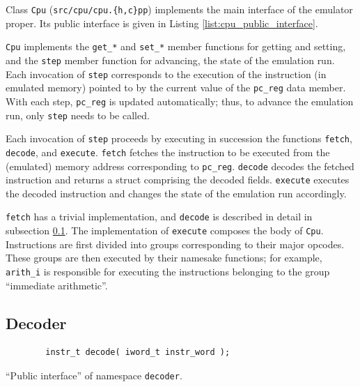 \documentclass[a4paper]{amsart}
\begin{document}
\noindent
Class \texttt{Cpu} (\texttt{src/cpu/cpu.\{h,c\}pp}) implements the main interface of the emulator proper.
Its public interface is given in Listing \ref{list:cpu_public_interface}.

\texttt{Cpu} implements the \texttt{get\_*} and \texttt{set\_*} member functions for getting and setting, and the \texttt{step} member function for advancing, the state of the emulation run.
Each invocation of \texttt{step} corresponds to the execution of the instruction (in emulated memory) pointed to by the current value of the \texttt{pc\_reg} data member.
With each step, \texttt{pc\_reg} is updated automatically; thus, to advance the emulation run, only \texttt{step} needs to be called.

Each invocation of \texttt{step} proceeds by executing in succession the functions \texttt{fetch}, \texttt{decode}, and \texttt{execute}.
\texttt{fetch} fetches the instruction to be executed from the (emulated) memory address corresponding to \texttt{pc\_reg}.
\texttt{decode} decodes the fetched instruction and returns a struct comprising the decoded fields.
\texttt{execute} executes the decoded instruction and changes the state of the emulation run accordingly.

\texttt{fetch} has a trivial implementation, and \texttt{decode} is described in detail in subsection \ref{subsec:decoder}.
The implementation of \texttt{execute} composes the body of \texttt{Cpu}.
Instructions are first divided into groups corresponding to their major opcodes.
These groups are then executed by their namesake functions; for example, \texttt{arith\_i} is responsible for executing the instructions belonging to the group ``immediate arithmetic''.


\medbreak
\subsection{Decoder}\label{subsec:decoder}

\begin{listing}
    \begin{verbatim}
        instr_t decode( iword_t instr_word );
    \end{verbatim}
    \caption{``Public interface'' of namespace \texttt{decoder}.}
    \label{list:decoder_public_interface}
\end{listing}
\end{document}
